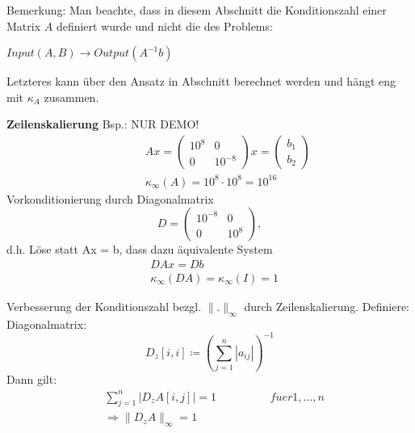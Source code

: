 Bemerkung: Man beachte, dass in diesem Abschnitt die Konditionszahl einer Matrix $A$ definiert wurde und nicht die des Problems:

$Input\left(A,B\right) \rightarrow Output\left(A^{-1}b\right)$

Letzteres kann über den Ansatz in Abschnitt  berechnet werden und hängt eng mit $\kappa_A$ zusammen.

\textbf{Zeilenskalierung}
Bsp.: NUR DEMO!
\begin{equation*}
  \begin{align*}
    \hspace{1cm} &Ax = \begin{pmatrix} 10^8 & 0 \\ 0 & 10^{-8} \end{pmatrix} x = \begin{pmatrix}b_1 \\ b_2\end{pmatrix} \\
    &\kappa_\infty\left(A\right) = 10^8 \cdot 10^8 = 10^{16}
  \end{align*}
\end{equation*}
Vorkonditionierung durch Diagonalmatrix
\begin{equation*}
  D = \begin{pmatrix}10^{-8} & 0 \\ 0 & 10^8\end{pmatrix},
\end{equation*}
d.h. Löse statt Ax = b, dass dazu äquivalente System
\begin{equation*}
  \begin{align*}
    &DAx = Db \\
    &\kappa_\infty\left(DA\right) = \kappa_\infty\left(I\right) = 1
	\end{align*}	
\end{equation*}

Verbesserung der Konditionszahl bezgl. $\|.\|_\infty$ durch Zeilenskalierung.
Definiere: Diagonalmatrix:
\begin{equation*}
  D_z \left[ i,i \right] \coloneqq \left(\sum\limits_{j=1}^{n}{\left|a_{ij}\right|}\right)^{-1} %
\end{equation*}
Dann gilt:
\begin{equation*}
  \begin{align*}
    &\sum\limits_{j=1}^{n}{\left|D_zA\left[i,j\right]\right|} = 1  \hspace{2cm} fuer 1, ..., n \\
    &\Rightarrow \|D_zA\|_\infty = 1
		\end{align*}
\end{equation*}